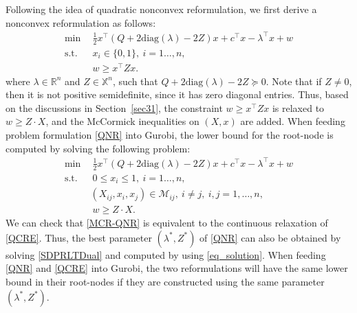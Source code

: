 \documentclass[pdflatex,sn-mathphys-num]{sn-jnl}%
\theoremstyle{thmstyleone}%
\theoremstyle{thmstyletwo}%
\theoremstyle{thmstylethree}%
\begin{document}
Following the idea of quadratic nonconvex reformulation, we first derive a nonconvex reformulation as follows:
\begin{equation}\label{QNR}\tag{QNR}
	\begin{aligned}
		\min ~&~ \frac{1}{2}x^\top(Q+2\textrm{diag}(\lambda)-2Z) x+c^\top x -\lambda^\top x + w \\
		\textrm{s.t.}~&~ x_i \in \{0,1\},~i=1\ldots,n,\\
		~&~ w\geq x^\top Z x.
	\end{aligned}
\end{equation}
where $\lambda\in\mathbb{R}^n$ and $Z\in\mathbb{X}^n$, such that $Q+2\textrm{diag}(\lambda)-2Z\succeq 0$. Note that if $Z\neq 0$, then it is not positive semidefinite, since it has zero diagonal entries. Thus, based on the discussions in Section~\ref{sec31}, the constraint $w\geq x^\top Z x$ is relaxed to $w\geq Z\cdot X$, and the McCormick inequalities on $(X,x)$ are added.  When feeding problem formulation \eqref{QNR} into Gurobi, the lower bound for the root-node is computed by solving the following problem:
\begin{equation}\label{MCR-QNR}
	\begin{aligned}
		\min ~&~ \frac{1}{2}x^\top(Q+2\textrm{diag}(\lambda)-2Z) x+c^\top x -\lambda^\top x + w \\
		\textrm{s.t.}~&~ 0\leq x_i \leq 1,~i=1\ldots,n,\\
		&(X_{ij},x_i,x_j)\in \mathcal{M}_{ij}, ~i\neq j, ~i,j=1,\ldots,n,\\
		&~ w\geq  Z\cdot X.
	\end{aligned}
\end{equation}
We can check that \eqref{MCR-QNR} is equivalent to the continuous relaxation of \eqref{QCRE}. Thus, the best parameter $(\lambda^\ast,Z^\ast)$ of \eqref{QNR} can also be obtained by solving \eqref{SDPRLTDual} and computed by using \eqref{eq_solution}. When feeding \eqref{QNR} and \eqref{QCRE} into Gurobi, the two reformulations will have the same lower bound in their root-nodes if they are constructed using the same parameter $(\lambda^\ast,Z^\ast)$.
\end{document}

